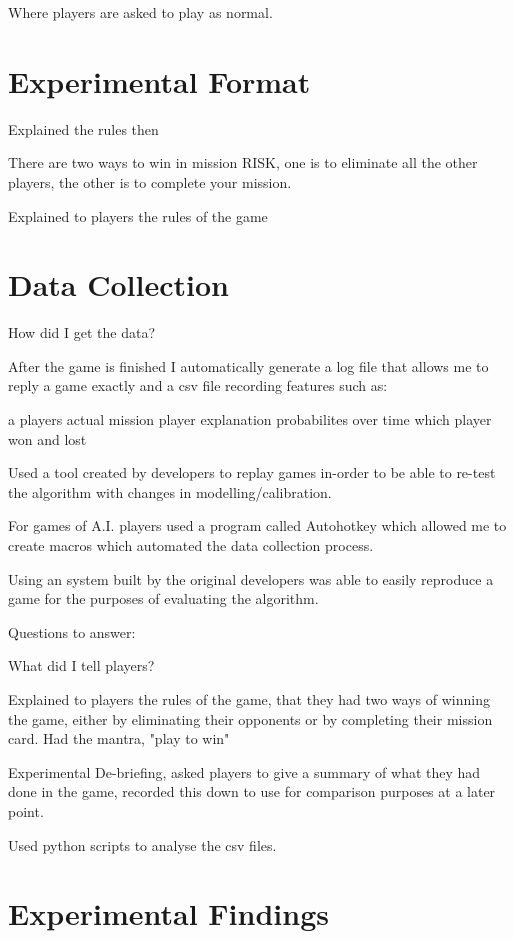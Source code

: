 \documentclass[parskip]{cs4rep}
\begin{document}
Where players are asked to play as normal.

\section{Experimental Format}

Explained the rules then

There are two ways to win in mission RISK, one is to eliminate all the other players, the other is to complete your mission.

Explained to players the rules of the game 

\section{Data Collection}

How did I get the data?

After the game is finished I automatically generate a log file that allows me to reply a game exactly and a csv file recording features such as:

a players actual mission
player explanation probabilites over time
which player won and lost

Used a tool created by developers to replay games in-order to be able to re-test the algorithm with changes in modelling/calibration.

For games of A.I. players used a program called Autohotkey which allowed me to create macros which automated the data collection process.

Using an system built by the original developers was able to easily reproduce a game for the purposes of evaluating the algorithm.

Questions to answer:

What did I tell players?

Explained to players the rules of the game, that they had two ways of winning the game, either by eliminating their opponents or by completing their mission card. Had the mantra, "play to win"

Experimental De-briefing, asked players to give a summary of what they had done in the game, recorded this down to use for comparison purposes at a later point.

Used python scripts to analyse the csv files.

\section{Experimental Findings}
\end{document}
